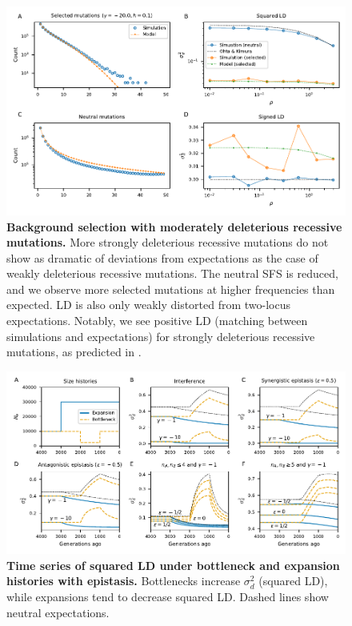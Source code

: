 \documentclass[]{article}
\begin{document}
\begin{figure}[ht!]
    \centering
    \includegraphics{../figures/bgs_gamma_-20.0_h_0.1_n_80}
    \caption{
        \textbf{Background selection with moderately deleterious recessive mutations.}
        More strongly deleterious recessive mutations do not show as dramatic of
        deviations from expectations as the case of weakly deleterious recessive
        mutations. The neutral SFS is reduced, and we observe more selected mutations
        at higher frequencies than expected. LD is also only weakly distorted from
        two-locus expectations. Notably, we see positive LD (matching between
        simulations and expectations) for strongly deleterious recessive mutations,
        as predicted in \citet{Roze2021-cf}.
    }
    \label{fig:bgs4}
\end{figure}

\begin{figure}[ht!]
    \centering
    \includegraphics{../figures/demog_bottle_expand.sd2}
    \caption{
        \textbf{Time series of squared LD under bottleneck 
        and expansion histories with epistasis.}
        Bottlenecks increase \(\sigma_d^2\) (squared LD),
        while expansions tend to decrease squared LD.
        Dashed lines show neutral expectations.
    }
    \label{fig:toy_sd2}
\end{figure}
\end{document}
